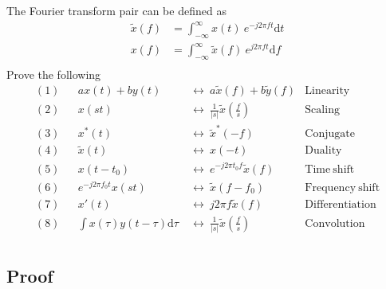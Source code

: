\documentclass{article}
\begin{document}
The Fourier transform pair can be defined as
\begin{align*}
    \widetilde{x}(f) &= \int_{- \infty}^{\infty} x(t) ~ e^{-j2\pi f t} \mathrm{d}t\\
    x(f) &= \int_{- \infty}^{\infty} \widetilde{x}(f) ~ e^{j2\pi f t} \mathrm{d}f\\
\end{align*}
Prove the following
\begin{align*}
    (1)&&  ax(t) + by(t)~ & \leftrightarrow ~a\widetilde{x}(f) + b\widetilde{y}(f) &\mathrm{Linearity}\\
    (2)&&  x(st)~& \leftrightarrow ~\frac{1}{|s|} \widetilde{x}(\frac{f}{s}) &\mathrm{Scaling}\\
    (3)&&  x^*(t)~& \leftrightarrow ~\widetilde{x}^*(-f) &\mathrm{Conjugate}\\
    (4)&&  \widetilde{x}(t)~ & \leftrightarrow ~x(-t) &\mathrm{Duality}\\
    (5)&&  x(t - t_0)~& \leftrightarrow  ~e^{-j2\pi t_0 f}\widetilde{x}(f) &\mathrm{Time~shift}\\
    (6)&&  e^{-j2\pi f_0 t}x(st)~& \leftrightarrow  ~\widetilde{x}(f - f_0) &\mathrm{Frequency~shift}\\
    (7)&&  x'(t)~& \leftrightarrow  ~j2\pi f\widetilde{x}(f) &\mathrm{Differentiation}\\
    (8)&&  \int x(\tau)y(t - \tau)\mathrm{d}\tau~ & \leftrightarrow ~\frac{1}{|s|}\widetilde{x}(\frac{f}{s})&\mathrm{Convolution}\\
\end{align*}

\subsection{Proof}
\end{document}
